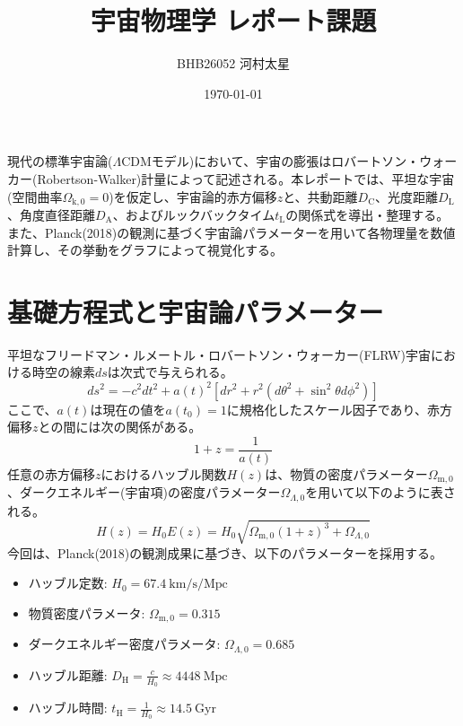 \documentclass[dvipdfmx]{jlreq}
\title{宇宙物理学 レポート課題}
\author{BHB26052 河村太星}
\date{\today}
\begin{document}
\maketitle

現代の標準宇宙論($\Lambda$CDMモデル)において、宇宙の膨張はロバートソン・ウォーカー(Robertson-Walker)計量によって記述される。本レポートでは、平坦な宇宙(空間曲率$\Omega_{\mathrm{k},0}=0$)を仮定し、宇宙論的赤方偏移$z$と、共動距離$D_{\mathrm{C}}$、光度距離$D_{\mathrm{L}}$、角度直径距離$D_{\mathrm{A}}$、およびルックバックタイム$t_{\mathrm{L}}$の関係式を導出・整理する。また、Planck(2018)の観測に基づく宇宙論パラメーターを用いて各物理量を数値計算し、その挙動をグラフによって視覚化する。

\section{基礎方程式と宇宙論パラメーター}
平坦なフリードマン・ルメートル・ロバートソン・ウォーカー(FLRW)宇宙における時空の線素$ds$は次式で与えられる。
\begin{equation}
    ds^2 = -c^2 dt^2 + a(t)^2 \left[ dr^2 + r^2 (d\theta^2 + \sin^2\theta d\phi^2) \right]
\end{equation}
ここで、$a(t)$は現在の値を$a(t_0)=1$に規格化したスケール因子であり、赤方偏移$z$との間には次の関係がある。
\begin{equation}
    1 + z = \frac{1}{a(t)}
\end{equation}
任意の赤方偏移$z$におけるハッブル関数$H(z)$は、物質の密度パラメーター$\Omega_{\mathrm{m},0}$、ダークエネルギー(宇宙項)の密度パラメーター$\Omega_{\Lambda,0}$を用いて以下のように表される。
\begin{equation}
    H(z) = H_0 E(z) = H_0 \sqrt{\Omega_{\mathrm{m},0}(1+z)^3 + \Omega_{\Lambda,0}}
\end{equation}
今回は、Planck(2018)の観測成果に基づき、以下のパラメーターを採用する。
\begin{itemize}
    \item ハッブル定数: $H_0 = 67.4 \ \mathrm{km/s/Mpc}$
    \item 物質密度パラメータ: $\Omega_{\mathrm{m},0} = 0.315$
    \item ダークエネルギー密度パラメータ: $\Omega_{\Lambda,0} = 0.685$
    \item ハッブル距離: $D_{\mathrm{H}} = \frac{c}{H_0} \approx 4448 \ \mathrm{Mpc}$
    \item ハッブル時間: $t_{\mathrm{H}} = \frac{1}{H_0} \approx 14.5 \ \mathrm{Gyr}$
\end{itemize}
\end{document}
